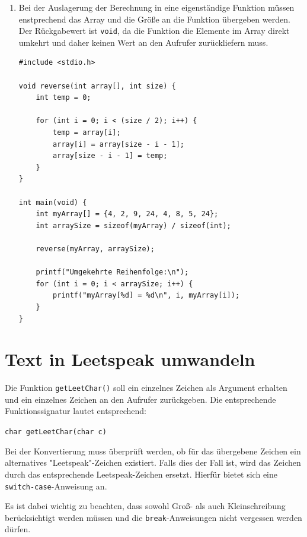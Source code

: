 \begin{enumerate}
\item Bei der Auslagerung der Berechnung in eine eigenständige Funktion müssen
enstprechend das Array und die Größe an die Funktion übergeben werden. Der
Rückgabewert ist \texttt{void}, da die Funktion die Elemente im Array
direkt umkehrt und daher keinen Wert an den Aufrufer zurückliefern muss.

\begin{verbatim}
#include <stdio.h>

void reverse(int array[], int size) {
    int temp = 0;

    for (int i = 0; i < (size / 2); i++) {
        temp = array[i];
        array[i] = array[size - i - 1];
        array[size - i - 1] = temp;
    }
}

int main(void) {
    int myArray[] = {4, 2, 9, 24, 4, 8, 5, 24};
    int arraySize = sizeof(myArray) / sizeof(int);

    reverse(myArray, arraySize);

    printf("Umgekehrte Reihenfolge:\n");
    for (int i = 0; i < arraySize; i++) {
        printf("myArray[%d] = %d\n", i, myArray[i]);
    }
}
\end{verbatim}

\end{enumerate}




\chapter{Text in Leetspeak umwandeln}

Die Funktion \texttt{getLeetChar()} soll ein einzelnes Zeichen als
Argument erhalten und ein einzelnes Zeichen an den Aufrufer zurückgeben. Die
entsprechende Funktionssignatur lautet entsprechend:

\texttt{char getLeetChar(char c)}

Bei der Konvertierung muss überprüft werden, ob für das übergebene Zeichen ein
alternatives "Leetspeak"-Zeichen existiert. Falls dies der Fall ist, wird das
Zeichen durch das entsprechende Leetspeak-Zeichen ersetzt. Hierfür bietet sich
eine \texttt{switch-case}-Anweisung an.

Es ist dabei wichtig zu beachten, dass sowohl Groß- als auch Kleinschreibung
berücksichtigt werden müssen und die \texttt{break}-Anweisungen nicht
vergessen werden dürfen.

